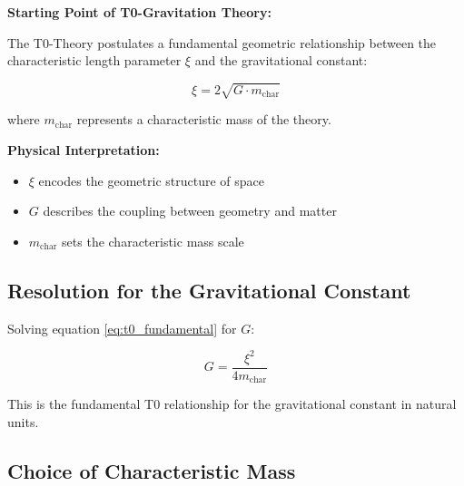 \documentclass[12pt,a4paper]{article}
\begin{document}
	\begin{derivation}
		\textbf{Starting Point of T0-Gravitation Theory:}
		
		The T0-Theory postulates a fundamental geometric relationship between the characteristic length parameter $\xi$ and the gravitational constant:
		
		\begin{equation}
			\xi = 2\sqrt{G \cdot m_{\text{char}}}
			\label{eq:t0_fundamental}
		\end{equation}
		
		where $m_{\text{char}}$ represents a characteristic mass of the theory.
		
		\textbf{Physical Interpretation:}
		\begin{itemize}
			\item $\xi$ encodes the geometric structure of space
			\item $G$ describes the coupling between geometry and matter
			\item $m_{\text{char}}$ sets the characteristic mass scale
		\end{itemize}
	\end{derivation}
	
	\subsection{Resolution for the Gravitational Constant}
	
	Solving equation \eqref{eq:t0_fundamental} for $G$:
	
	\begin{equation}
		\boxed{G = \frac{\xi^2}{4 m_{\text{char}}}}
		\label{eq:g_fundamental}
	\end{equation}
	
	This is the fundamental T0 relationship for the gravitational constant in natural units.
	
	\subsection{Choice of Characteristic Mass}
	
\end{document}
